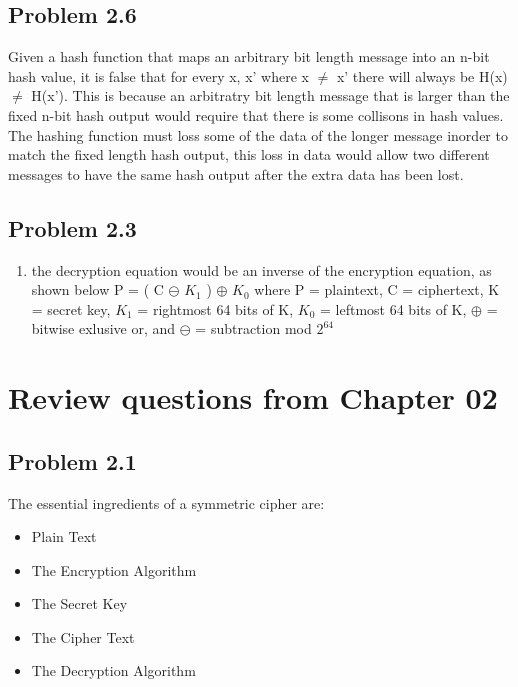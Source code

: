 \documentclass[12pt]{article}
\begin{document}
\subsection{Problem  2.6 \cite[p.~69]{stallings}}
Given a hash function that maps an arbitrary bit length message into an n-bit hash value, it is false that for every x, x' where x $\neq$ x' there will always be H(x) $\neq$ H(x'). This is because an arbitratry bit length message that is larger than the fixed n-bit hash output would require that there is some collisons in hash values. The hashing function must loss some of the data of the longer message inorder to match the fixed length hash output, this loss in data would allow two different messages to have the same hash output after the extra data has been lost. 

\subsection{Problem  2.3 \cite[p.~69]{stallings}}
\begin{enumerate}[label=(\alph*)]
\item the decryption equation would be an inverse of the encryption equation, as shown below
\newline
 P = ( C $\ominus$ $ K_{1}$ ) $\oplus$ $K_{0}$
\newline
where P = plaintext, C = ciphertext, K = secret key, $K_{1}$ = rightmost 64 bits of K, $K_{0}$ = leftmost 64 bits of K, $\oplus$ = bitwise exlusive or, and $\ominus$ = subtraction mod $2^{64}$
\end{enumerate}


\newpage


\section{Review questions from Chapter 02}

\subsection{Problem  2.1 \cite[p.~68]{stallings}}
The essential ingredients of a symmetric cipher are:
\begin{itemize}
\item Plain Text
\item The Encryption Algorithm
\item The Secret Key
\item The Cipher Text
\item The Decryption Algorithm
\end{itemize}
\end{document}
